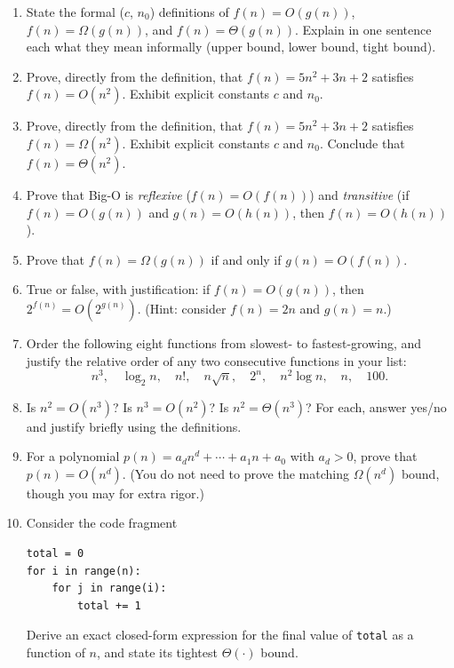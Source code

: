\documentclass[11pt]{article}
\begin{document}
\begin{enumerate}[label=\textbf{A\arabic*.}, leftmargin=2.2em]

\item State the formal ($c$, $n_0$) definitions of $f(n) = O(g(n))$, $f(n) = \Omega(g(n))$,
and $f(n) = \Theta(g(n))$. Explain in one sentence each what they mean informally (upper
bound, lower bound, tight bound).

\item Prove, directly from the definition, that $f(n) = 5n^2 + 3n + 2$ satisfies
$f(n) = O(n^2)$. Exhibit explicit constants $c$ and $n_0$.

\item Prove, directly from the definition, that $f(n) = 5n^2 + 3n + 2$ satisfies
$f(n) = \Omega(n^2)$. Exhibit explicit constants $c$ and $n_0$. Conclude that $f(n) =
\Theta(n^2)$.

\item Prove that Big-O is \emph{reflexive} ($f(n) = O(f(n))$) and \emph{transitive} (if
$f(n) = O(g(n))$ and $g(n) = O(h(n))$, then $f(n) = O(h(n))$).

\item Prove that $f(n) = \Omega(g(n))$ if and only if $g(n) = O(f(n))$.

\item True or false, with justification: if $f(n) = O(g(n))$, then $2^{f(n)} = O(2^{g(n)})$.
(Hint: consider $f(n) = 2n$ and $g(n) = n$.)

\item Order the following eight functions from slowest- to fastest-growing, and justify
the relative order of any two consecutive functions in your list:
\[
  n^3, \quad \log_2 n, \quad n!, \quad n\sqrt{n}, \quad 2^n, \quad n^2 \log n, \quad n,
  \quad 100.
\]

\item Is $n^2 = O(n^3)$? Is $n^3 = O(n^2)$? Is $n^2 = \Theta(n^3)$? For each, answer
yes/no and justify briefly using the definitions.

\item For a polynomial $p(n) = a_d n^d + \cdots + a_1 n + a_0$ with $a_d > 0$, prove that
$p(n) = O(n^d)$. (You do not need to prove the matching $\Omega(n^d)$ bound, though you may
for extra rigor.)

\item Consider the code fragment
\begin{verbatim}
total = 0
for i in range(n):
    for j in range(i):
        total += 1
\end{verbatim}
Derive an exact closed-form expression for the final value of \texttt{total} as a function
of $n$, and state its tightest $\Theta(\cdot)$ bound.


\end{enumerate}
\end{document}

